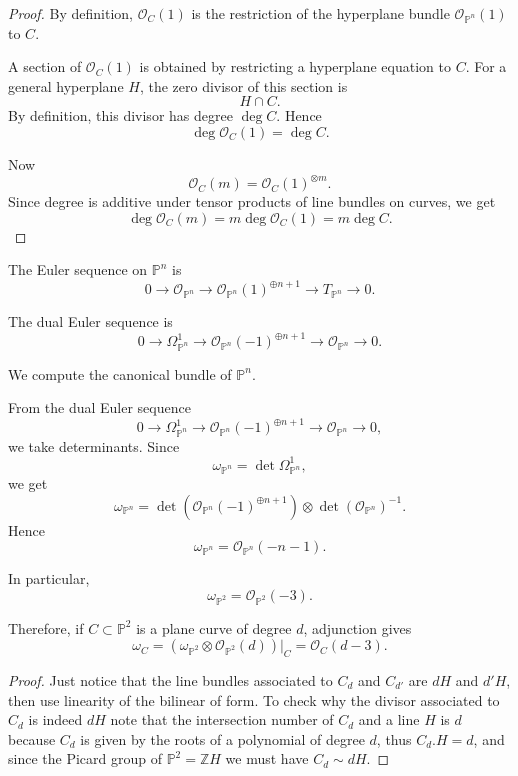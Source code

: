 \begin{proof}
By definition, $\mathcal O_C(1)$ is the
restriction of the hyperplane bundle
$\mathcal O_{\mathbb P^n}(1)$ to $C$.

A section of $\mathcal O_C(1)$ is obtained
by restricting a hyperplane equation to
$C$. For a general hyperplane $H$, the
zero divisor of this section is
$$
  H\cap C.
$$
By definition, this divisor has degree
$\deg C$. Hence
$$
  \deg \mathcal O_C(1)=\deg C.
$$

Now
$$
  \mathcal O_C(m)
  =
  \mathcal O_C(1)^{\otimes m}.
$$
Since degree is additive under tensor
products of line bundles on curves, we get
$$
  \deg \mathcal O_C(m)
  =
  m\deg \mathcal O_C(1)
  =
  m\deg C.
$$
\end{proof}

\medskip\noindent
The Euler sequence on $\mathbb P^n$ is
$$
  0
  \to
  \mathcal O_{\mathbb P^n}
  \to
  \mathcal O_{\mathbb P^n}(1)^{\oplus n+1}
  \to
  T_{\mathbb P^n}
  \to
  0.
$$

The dual Euler sequence is
$$
  0
  \to
  \Omega^1_{\mathbb P^n}
  \to
  \mathcal O_{\mathbb P^n}(-1)^{\oplus n+1}
  \to
  \mathcal O_{\mathbb P^n}
  \to
  0.
$$

\begin{example}
\label{example-canonical-projective-space}
We compute the canonical bundle of
$\mathbb P^n$.

From the dual Euler sequence
$$
  0
  \to
  \Omega^1_{\mathbb P^n}
  \to
  \mathcal O_{\mathbb P^n}(-1)^{\oplus n+1}
  \to
  \mathcal O_{\mathbb P^n}
  \to
  0,
$$
we take determinants. Since
$$
  \omega_{\mathbb P^n}
  =
  \det \Omega^1_{\mathbb P^n},
$$
we get
$$
  \omega_{\mathbb P^n}
  =
  \det
  \left(
    \mathcal O_{\mathbb P^n}(-1)^{\oplus n+1}
  \right)
  \otimes
  \det(\mathcal O_{\mathbb P^n})^{-1}.
$$
Hence
$$
  \omega_{\mathbb P^n}
  =
  \mathcal O_{\mathbb P^n}(-n-1).
$$

In particular,
$$
  \omega_{\mathbb P^2}
  =
  \mathcal O_{\mathbb P^2}(-3).
$$

Therefore, if
$C\subset \mathbb P^2$ is a plane curve
of degree $d$, adjunction gives
$$
  \omega_C
  =
  \left(
    \omega_{\mathbb P^2}
    \otimes
    \mathcal O_{\mathbb P^2}(d)
  \right)\big|_C
  =
  \mathcal O_C(d-3).
$$
\end{example}


\begin{proof}
Just notice that the line bundles associated
to
$C_d$ and $C_{d'}$ are $dH$ and $d'H$,
then use linearity of the bilinear of form.
To check why the divisor associated to $C_d$
is indeed $dH$ note that the intersection
number
of $C_d$ and a line $H$ is $d$ because $C_d$
is given by the roots of a polynomial of
degree $d$,
thus $C_d.H=d$, and since the Picard group of
$\mathbb{P}^2=\mathbb{Z}H$
we must have $C_d \sim dH$.
\end{proof}
